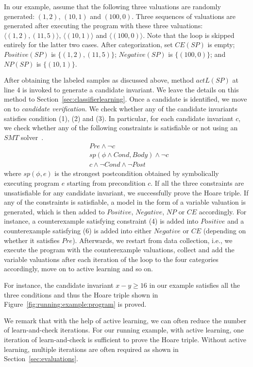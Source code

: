 \begin{example}
In our example, assume that the following three valuations are randomly generated:
$(1, 2)$, $(10, 1)$ and $(100, 0)$. Three sequences of valuations are generated after executing the program with these three valuations: $\langle (1, 2), (11, 5) \rangle$, $\langle (10, 1) \rangle$ and $\langle (100, 0) \rangle$.
Note that the loop is skipped entirely for the latter two cases. After categorization, set $CE(SP)$ is empty; $Positive(SP)$ is $\{(1, 2),(11, 5)\}$; $Negative(SP)$ is $\{(100, 0)\}$; and $NP(SP)$ is $\{(10, 1)\}$.
\end{example}
After obtaining the labeled samples as discussed above, method $actL(SP)$ at line 4 is invoked to generate a candidate invariant. We leave the details on this method to Section~\ref{sec:classifierlearning}. Once a candidate is identified, we move on to \emph{candidate verification}. We check whether any of the candidate invariants satisfies condition (1), (2) and (3). In particular, for each candidate invariant $c$, we check whether any of the following constraints is satisfiable or not using an $SMT$ solver~\cite{barrett2009satisfiability,de2008z3}.
\begin{align}
    & \mathit{Pre} \land \neg c \label{check:inv:pre} \\
     & sp(\phi \land Cond, Body) \land \neg c \label{check:inv:loop} \\
    & c \land \neg Cond \land \neg Post \label{check:inv:post}
\end{align}
where $sp(\phi,e)$ is the strongest postcondition obtained by symbolically executing program $e$ starting from precondition $c$. If all the three constraints are unsatisfiable for any candidate invariant, we successfully prove the Hoare triple. If any of the constraints is satisfiable, a model in the form of a variable valuation is generated, which is then added to $Positive$, $Negative$, $NP$ or $CE$ accordingly. %
For instance, a counterexample satisfying constraint (4) is added into $Positive$ and a counterexample satisfying (6) is added into either $Negative$ or $CE$ (depending on whether it satisfies $Pre$). Afterwards, we restart from data collection, i.e., we execute the program with the counterexample valuations,
collect and add the variable valuations after each iteration of the loop to the four categories accordingly, move on to active learning and so on.
 


For instance, the candidate invariant $\mathit{x - y \geq 16}$ in our example satisfies all the three conditions and thus the Hoare triple shown in Figure~\ref{fig:running:example:program} is proved.

We remark that with the help of active learning, we can often reduce the number of learn-and-check iterations. %
For our running example, with active learning, one iteration of learn-and-check is sufficient to prove the Hoare triple.
Without active learning, multiple iterations are often required as shown in Section~\ref{sec:evaluations}.